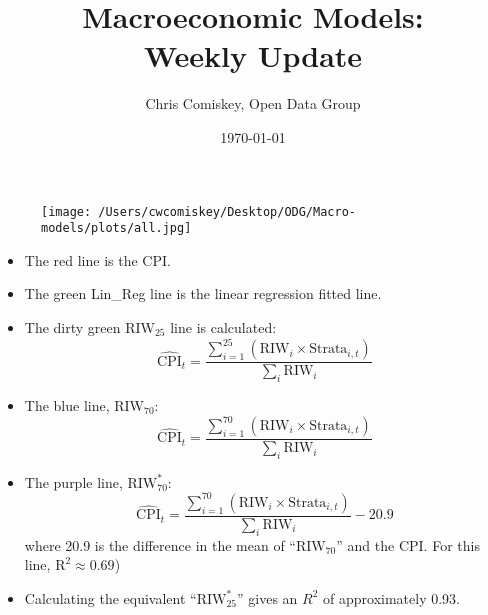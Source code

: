 \documentclass{article}
\title{Macroeconomic Models: \\ Weekly Update}
\author{Chris Comiskey, Open Data Group}
\date{\today}
\begin{document}
\maketitle{}
\begin{figure}[H]
\centering
\texttt{[image: /Users/cwcomiskey/Desktop/ODG/Macro-models/plots/all.jpg]}
\end{figure}
\begin{itemize}
\item The red line is the CPI.

\item The green Lin\_Reg line is the linear regression fitted line.

\item The dirty green $\text{RIW}_{25}$ line is calculated: 
$$ \widehat{\text{CPI}}_{t} = \frac{\sum_{i=1}^{25} \left( \text{RIW}_{i}\times \text{Strata}_{i,t} \right) }{\sum_{i} \text{RIW}_{i}} $$

\item The blue line, $\text{RIW}_{70}$:
$$ \widehat{\text{CPI}}_{t} = \frac{\sum_{i=1}^{70} \left( \text{RIW}_{i}\times \text{Strata}_{i,t} \right) }{\sum_{i} \text{RIW}_{i}} $$

\item The purple line, $\text{RIW}_{70}^{*}$:
$$ \widehat{\text{CPI}}_{t} = \frac{\sum_{i=1}^{70} \left( \text{RIW}_{i}\times \text{Strata}_{i,t} \right) }{\sum_{i} \text{RIW}_{i}} - 20.9$$
where 20.9 is the difference in the mean of ``$\text{RIW}_{70}$'' and the CPI. For this line, $\text{R}^{2} \approx 0.69$)
\item Calculating the equivalent ``$\text{RIW}_{25}^{*}$'' gives an $R^{2}$ of approximately 0.93.
\end{itemize}
\end{document}
